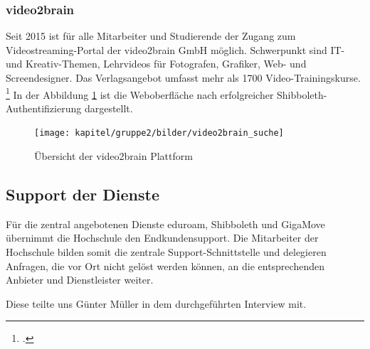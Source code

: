 \subsubsection{video2brain}
Seit 2015 ist für alle Mitarbeiter und Studierende der Zugang zum Videostreaming-Portal der video2brain GmbH möglich. Schwerpunkt sind IT- und Kreativ-Themen, Lehrvideos für Fotografen, Grafiker, Web- und Screendesigner. Das Verlagsangebot umfasst mehr als 1700 Video-Trainingskurse. \footcite{adsgmbh_video2brain_2013} In der Abbildung \ref{fig_video2brain_suchergebnis} ist die Weboberfläche nach erfolgreicher Shibboleth-Authentifizierung dargestellt.

\begin{figure}
	\centering
	\texttt{[image: kapitel/gruppe2/bilder/video2brain\_suche]}
	\caption{Übersicht der video2brain Plattform \protect\footnotemark}
	\label{fig_video2brain_suchergebnis}
\end{figure}

\subsection{Support der Dienste}
Für die zentral angebotenen Dienste eduroam, Shibboleth und GigaMove übernimmt die Hochschule den Endkundensupport. Die Mitarbeiter der Hochschule bilden somit die zentrale Support-Schnittstelle und delegieren Anfragen, die vor Ort nicht gelöst werden können, an die entsprechenden Anbieter und Dienstleister weiter.

Diese teilte uns Günter Müller in dem durchgeführten Interview mit.